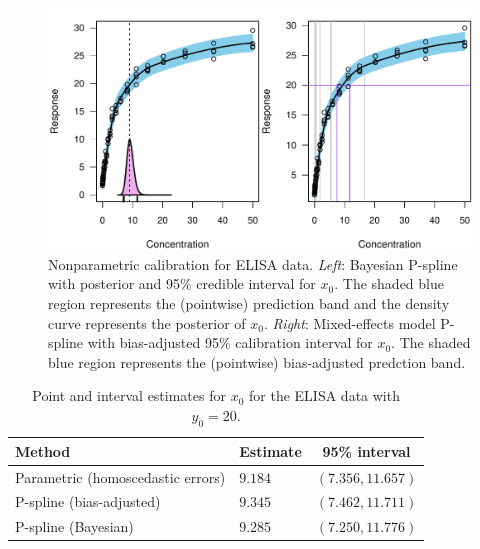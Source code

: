 \documentclass[cmfont,usenames,dvipsnames,leqno]{afit-etd}\usepackage[]{graphicx}\usepackage[]{color}
\newenvironment{knitrout}{}{} %
\renewenvironment{knitrout}{\begin{singlespace}}{\end{singlespace}}
\begin{document}
\begin{knitrout}
\color{fgcolor}\begin{figure}[H]

\includegraphics[width=0.9\linewidth]{figure/elisa-jags} \caption[Bayesian nonparametric calibration for ELISA data]{Nonparametric calibration for ELISA data. \textit{Left}: Bayesian \ac{P-spline} with posterior and 95\% credible interval for $x_0$. The shaded blue region represents the (pointwise) prediction band and the density curve represents the posterior of $x_0$. \textit{Right}: Mixed-effects model \ac{P-spline} with bias-adjusted 95\% calibration interval for $x_0$. The shaded blue region represents the (pointwise) bias-adjusted predction band.\label{fig:elisa-jags}}
\end{figure}


\end{knitrout}


\begin{table}[H]
\centering
\caption[Calibration results for the ELISA data]{Point and interval estimates for $x_0$ for the ELISA data with $y_0 = 20$.\label{tab:elisa}}
\begin{tabular}{llc}
  \toprule
  \textbf{Method} & \textbf{Estimate} & \textbf{95\% interval} \\
  \midrule
  Parametric (homoscedastic errors)   & $9.184$ & $(7.356, 11.657)$ \\
  \ac{P-spline} (bias-adjusted)            & $9.345$ & $(7.462, 11.711)$ \\
  \ac{P-spline} (Bayesian)                 & $9.285$ & $(7.250, 11.776)$ \\
  \bottomrule
\end{tabular}
\end{table}
\end{document}
